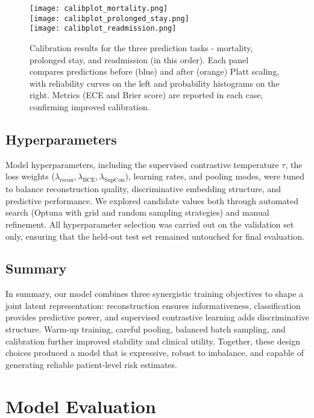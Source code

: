 \documentclass{article}
\theoremstyle{plain}
\theoremstyle{definition}
\theoremstyle{remark}
\begin{document}
\begin{figure}[h]
    \centering
    \texttt{[image: calibplot\_mortality.png]}\\[0.2cm]
    \texttt{[image: calibplot\_prolonged\_stay.png]}\\[0.2cm]
    \texttt{[image: calibplot\_readmission.png]}
    \caption{Calibration results for the three prediction tasks - mortality, prolonged stay, and readmission (in this order). 
    Each panel compares predictions 
    before (blue) and after (orange) Platt scaling, with reliability curves on the left and 
    probability histograms on the right. Metrics (ECE and Brier score) are reported in each case, confirming improved calibration.}
    \label{fig:calibration}
\end{figure}

\subsection{Hyperparameters}

Model hyperparameters, including the supervised contrastive temperature $\tau$, the loss weights 
($\lambda_{\text{recon}}, \lambda_{\text{BCE}}, \lambda_{\text{SupCon}}$), learning rates, and pooling modes, 
were tuned to balance reconstruction quality, discriminative embedding structure, and predictive performance. 
We explored candidate values both through automated search (Optuna with grid and random sampling strategies) 
and manual refinement. All hyperparameter selection was carried out on the validation set only, 
ensuring that the held-out test set remained untouched for final evaluation.

\subsection{Summary}

In summary, our model combines three synergistic training objectives to shape a joint latent 
representation: reconstruction ensures informativeness, classification provides predictive power, 
and supervised contrastive learning adds discriminative structure. Warm-up training, careful pooling, 
balanced batch sampling, and calibration further improved stability and clinical utility.  
Together, these design choices produced a model that is expressive, robust to imbalance, and capable 
of generating reliable patient-level risk estimates.

\section{Model Evaluation}
\end{document}
